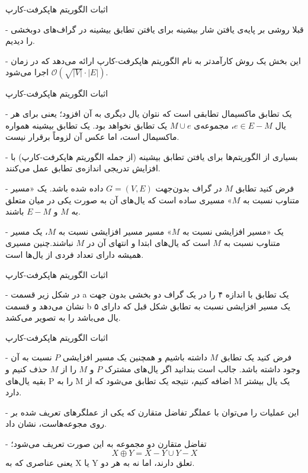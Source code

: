 
\begin{itemframe}{اثبات الگوریتم هاپکرفت-کارپ}
\item[-]
قبلا روشی بر پایه‌ی یافتن شار بیشینه برای یافتن تطابق بیشینه در گراف‌های دو‌بخشی را دیدیم.
\item[-]
این بخش یک روش کارآمدتر به نام الگوریتم هاپکرفت-کارپ
 ارائه می‌دهد که در زمان
 $\mathcal{O}(\sqrt{|V|} \cdot |E|)$
 اجرا می‌شود.
\end{itemframe}


\begin{itemframe}{اثبات الگوریتم هاپکرفت-کارپ}
\item[-]
یک تطابق ماکسیمال
 تطابقی است که نتوان یال دیگری به آن افزود؛ یعنی برای هر یال $e \in E - M$، مجموعه‌ی $M \cup {e}$ یک تطابق نخواهد بود. یک تطابق بیشینه همواره ماکسیمال است، اما عکس آن لزوماً برقرار نیست.

\item[-]
بسیاری از الگوریتم‌ها برای یافتن تطابق بیشینه (از جمله الگوریتم هاپکرفت-کارپ) با افزایش تدریجی اندازه‌ی تطابق عمل می‌کنند.
\item[-]
فرض کنید تطابق $M$ در گراف بدون‌جهت $G = (V, E)$ داده شده باشد. یک «مسیر متناوب نسبت به $M$»
مسیری ساده است که یال‌های آن به صورت یکی در میان متعلق به $M$ و $E - M$ باشند.
\item[-]
یک «مسیر افزایشی نسبت به $M$»
مسیر مسیر افزایشی نسبت به $M$، یک مسیر متناوب نسبت به $M$ است که یال‌های ابتدا و انتهای آن در $M$ نباشند.چنین مسیری همیشه دارای تعداد فردی از یال‌ها است.
\end{itemframe}


\begin{itemframe}{اثبات الگوریتم هاپکرفت-کارپ}
\item[-]
در شکل زیر قسمت a یک تطابق با اندازه ۴ را در یک گراف دو بخشی بدون جهت نشان می‌دهد و قسمت b یک مسیر افزایشی نسبت به تطابق شکل قبل که دارای ۵ یال می‌باشد را به تصویر می‌کشد.

\end{itemframe}


\begin{itemframe}{اثبات الگوریتم هاپکرفت-کارپ}
\item[-]
فرض کنید یک تطابق $M$ داشته باشیم و همچنین یک مسیر افزایشی $P$ نسبت به آن وجود داشته باشد. جالب است بندانید اگر یال‌های مشترک $P$ و $M$ را از $M$ حذف کنیم و بقیه یال‌های P را به M اضافه کنیم، نتیجه یک تطابق می‌شود که از M یک یال بیشتر دارد.
\item[-]
این عملیات را می‌توان با عملگر تفاضل متقارن
 که یکی از عملگرهای تعریف شده بر روی مجوعه‌هاست، نشان داد.
\item[-]
تفاضل متقارن دو مجموعه به این صورت تعریف می‌شود؛
$$ X \oplus Y = X - Y \cup Y - X$$
یعنی عناصری که به X یا Y تعلق دارند، اما نه به هر دو.
\end{itemframe}


